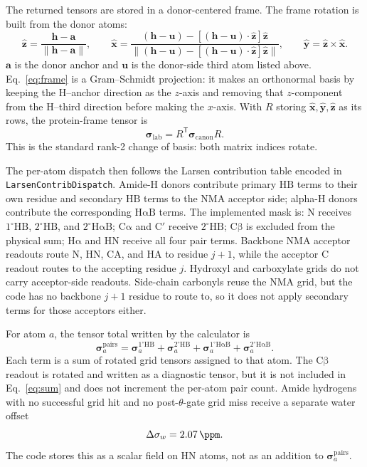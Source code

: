 \documentclass[11pt]{article}
\begin{document}
The returned tensors are stored in a donor-centered frame. The frame rotation
is built from the donor atoms:
\begin{equation}
  \hat{\bm z}=\frac{\bm h-\bm a}{\|\bm h-\bm a\|},\qquad
  \hat{\bm x}=
  \frac{(\bm h-\bm u)-[(\bm h-\bm u)\cdot\hat{\bm z}]\hat{\bm z}}
       {\|(\bm h-\bm u)-[(\bm h-\bm u)\cdot\hat{\bm z}]\hat{\bm z}\|},
  \qquad
  \hat{\bm y}=\hat{\bm z}\times\hat{\bm x}.
  \label{eq:frame}
\end{equation}
\(\bm a\) is the donor anchor and \(\bm u\) is the donor-side third atom
listed above. Eq.~\eqref{eq:frame} is a Gram--Schmidt projection: it makes an
orthonormal basis by keeping the H--anchor direction as the \(z\)-axis and
removing that \(z\)-component from the H--third direction before making the
\(x\)-axis. With \(R\) storing \(\hat{\bm x},\hat{\bm y},\hat{\bm z}\) as its
rows, the protein-frame tensor is
\begin{equation}
  \bm\sigma_{\mathrm{lab}} = R^{\mathsf T}\bm\sigma_{\mathrm{canon}}R .
  \label{eq:rotate}
\end{equation}
This is the standard rank-2 change of basis: both matrix indices rotate.

The per-atom dispatch then follows the Larsen contribution table encoded in
\texttt{LarsenContribDispatch}. Amide-H donors contribute primary
\(\mathrm{HB}\) terms to their own residue and secondary \(\mathrm{HB}\) terms
to the NMA acceptor side; alpha-H donors contribute the corresponding
\(\mathrm{H\alpha B}\) terms. The implemented mask is: N receives
\(1^\circ\mathrm{HB}\), \(2^\circ\mathrm{HB}\), and
\(2^\circ\mathrm{H\alpha B}\); \(\mathrm{C\alpha}\) and \(\mathrm{C}'\) receive
\(2^\circ\mathrm{HB}\); \(\mathrm{C\beta}\) is excluded from the physical sum;
\(\mathrm{H\alpha}\) and HN receive all four pair terms. Backbone NMA acceptor
readouts route N, HN, CA, and HA to residue \(j+1\), while the acceptor C
readout routes to the accepting residue \(j\). Hydroxyl and carboxylate grids
do not carry acceptor-side readouts. Side-chain carbonyls reuse the NMA grid,
but the code has no backbone \(j+1\) residue to route to, so it does not apply
secondary terms for those acceptors either.

For atom \(a\), the tensor total written by the calculator is
\begin{equation}
  \bm\sigma_a^{\mathrm{pairs}} =
  \bm\sigma_a^{1^\circ\mathrm{HB}}+
  \bm\sigma_a^{2^\circ\mathrm{HB}}+
  \bm\sigma_a^{1^\circ\mathrm{H\alpha B}}+
  \bm\sigma_a^{2^\circ\mathrm{H\alpha B}} .
  \label{eq:sum}
\end{equation}
Each term is a sum of rotated grid tensors assigned to that atom. The
\(\mathrm{C\beta}\) readout is rotated and written as a diagnostic tensor,
but it is not included in Eq.~\eqref{eq:sum} and does not increment the
per-atom pair count. Amide hydrogens with no successful grid hit and no
post-\(\theta\)-gate grid miss receive a separate water offset
\begin{equation}
  \Delta\sigma_w = \SI{2.07}{\ppm}.
  \label{eq:water}
\end{equation}
The code stores this as a scalar field on HN atoms, not as an addition to
\(\bm\sigma_a^{\mathrm{pairs}}\).
\end{document}
